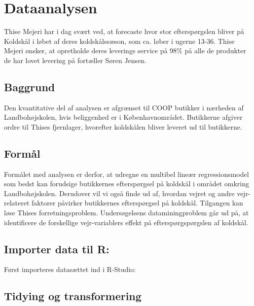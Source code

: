 \documentclass[
  12pt,
  a4paper,
  DIV=11,
  numbers=noendperiod]{scrartcl}
\begin{document}
\hypertarget{dataanalysen}{%
\section{Dataanalysen}\label{dataanalysen}}

Thise Mejeri har i dag svært ved, at forecaste hvor stor efterspørgslen
bliver på Koldskål i løbet af deres koldskålssæson, som ca. løber i
ugerne 13-36. Thise Mejeri ønsker, at opretholde deres leverings service
på 98\% på alle de produkter de har lovet levering på fortæller Søren
Jensen.

\hypertarget{baggrund}{%
\subsection{Baggrund}\label{baggrund}}

Den kvantitative del af analysen er afgrænset til COOP butikker i
nærheden af Landbohøjskolen, hvis beliggenhed er i Københavnområdet.
Butikkerne afgiver ordre til Thises fjernlager, hvorefter koldskålen
bliver leveret ud til butikkerne.

\hypertarget{formuxe5l}{%
\subsection{Formål}\label{formuxe5l}}

Formålet med analysen er derfor, at udregne en multibel lineær
regressionsmodel som bedst kan forudsige butikkernes efterspørgsel på
koldskål i området omkring Landbohøjskolen. Derudover vil vi også finde
ud af, hvordan vejret og andre vejr-relateret faktorer påvirker
butikkernes efterspørgsel på koldskål. Tilgangen kan løse Thises
forretningsproblem. Undersøgelsens dataminingproblem går ud på, at
identificere de forskellige vejr-variablers effekt på
efterspørgspørgslen af koldskål.

\hypertarget{importer-data-til-r}{%
\subsection{Importer data til R:}\label{importer-data-til-r}}

Først importeres datasættet ind i R-Studio:

\hypertarget{tidying-og-transformering}{%
\subsection{Tidying og transformering}\label{tidying-og-transformering}}
\end{document}
